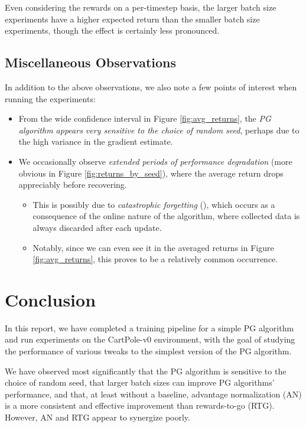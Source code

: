 \documentclass{article} %
\begin{document}
Even considering the rewards on a per-timestep basis, the larger batch size experiments
have a higher expected return than the smaller batch size experiments, though the effect
is certainly less pronounced.

\subsection{Miscellaneous Observations}
In addition to the above observations, we also note a few points of interest when running the experiments:
\begin{itemize}
    \item From the wide confidence interval in Figure \ref{fig:avg_returns}, the \textit{PG algorithm appears very sensitive to the choice of random seed}, 
    perhaps due to the high variance in the gradient estimate.
    \item We occasionally observe \textit{extended periods of 
        performance degradation} (more obvious in Figure \ref{fig:returns_by_seed}), where the average return drops appreciably
        before recovering. 
        \begin{itemize}
            \item This is possibly due to \textit{catastrophic forgetting} (\cite{Goodfellow-et-al-2013}), which occurs as a consequence of the online nature of the algorithm,
            where collected data is always discarded after each update.
            \item Notably, since we can even see it in the averaged returns in Figure \ref{fig:avg_returns},
            this proves to be a relatively common occurrence.
        \end{itemize}
\end{itemize}

\section{Conclusion}
In this report, we have completed a training pipeline for a simple PG algorithm
and run experiments on the CartPole-v0 environment, with the goal of studying the performance 
of various tweaks to the simplest version of the PG algorithm. 

We have observed most significantly that the PG algorithm is sensitive to the choice of random seed,
that larger batch sizes can improve PG algorithms' performance, 
and that, at least without a baseline, advantage normalization (AN) is a more 
consistent and effective improvement than rewards-to-go (RTG). 
However, AN and RTG appear to synergize poorly.
\end{document}
